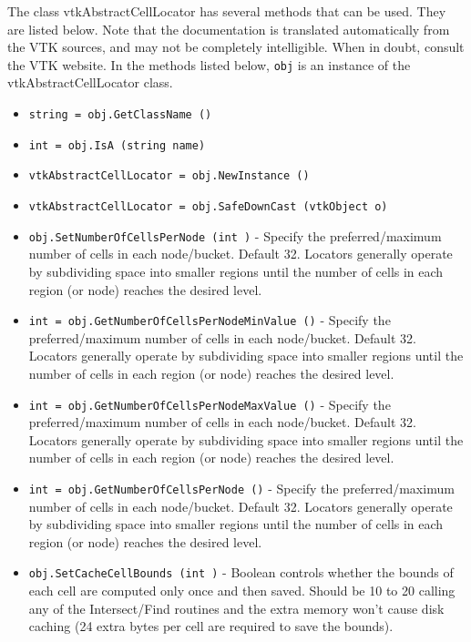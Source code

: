 The class vtkAbstractCellLocator has several methods that can be used.
  They are listed below.
Note that the documentation is translated automatically from the VTK sources,
and may not be completely intelligible.  When in doubt, consult the VTK website.
In the methods listed below, \verb|obj| is an instance of the vtkAbstractCellLocator class.
\begin{itemize}
\item  \verb|string = obj.GetClassName ()|

\item  \verb|int = obj.IsA (string name)|

\item  \verb|vtkAbstractCellLocator = obj.NewInstance ()|

\item  \verb|vtkAbstractCellLocator = obj.SafeDownCast (vtkObject o)|

\item  \verb|obj.SetNumberOfCellsPerNode (int )| -  Specify the preferred/maximum number of cells in each node/bucket. 
 Default 32. Locators generally operate by subdividing space into 
 smaller regions until the number of cells in each region (or node) 
 reaches the desired level.

\item  \verb|int = obj.GetNumberOfCellsPerNodeMinValue ()| -  Specify the preferred/maximum number of cells in each node/bucket. 
 Default 32. Locators generally operate by subdividing space into 
 smaller regions until the number of cells in each region (or node) 
 reaches the desired level.

\item  \verb|int = obj.GetNumberOfCellsPerNodeMaxValue ()| -  Specify the preferred/maximum number of cells in each node/bucket. 
 Default 32. Locators generally operate by subdividing space into 
 smaller regions until the number of cells in each region (or node) 
 reaches the desired level.

\item  \verb|int = obj.GetNumberOfCellsPerNode ()| -  Specify the preferred/maximum number of cells in each node/bucket. 
 Default 32. Locators generally operate by subdividing space into 
 smaller regions until the number of cells in each region (or node) 
 reaches the desired level.

\item  \verb|obj.SetCacheCellBounds (int )| -  Boolean controls whether the bounds of each cell are computed only
 once and then saved.  Should be 10 to 20%
 calling any of the Intersect/Find routines and the extra memory
 won't cause disk caching (24 extra bytes per cell are required to
 save the bounds).


\end{itemize}
